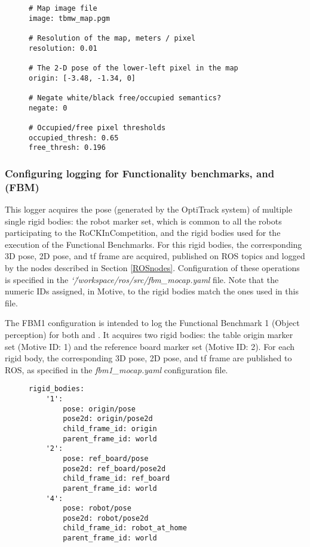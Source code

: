 \documentclass[a4paper]{article}
\newcommand{\ro}{RoCKIn}
\newcommand{\srcdir}{\char`\~/workspace/ros/src/}
\begin{document}
\begin{figure}[h!]
	\noindent
	\begin{minipage}[t!]{\linewidth}
		\begin{lstlisting}[caption=tbmw\_map.yaml]
# Map image file
image: tbmw_map.pgm

# Resolution of the map, meters / pixel
resolution: 0.01

# The 2-D pose of the lower-left pixel in the map
origin: [-3.48, -1.34, 0]

# Negate white/black free/occupied semantics?
negate: 0

# Occupied/free pixel thresholds
occupied_thresh: 0.65
free_thresh: 0.196
		\end{lstlisting}
	\end{minipage}
\end{figure}

\clearpage

\subsubsection{Configuring logging for Functionality benchmarks, \ro@Home and \ro@Work (FBM)}
This logger acquires the pose (generated by the OptiTrack system) of multiple single rigid bodies: the robot marker set, which is common to all the robots participating to the \ro Competition, and the rigid bodies used for the execution of the Functional Benchmarks. For this rigid bodies, the corresponding 3D pose, 2D pose, and tf frame are acquired, published on ROS topics and logged by the nodes described in Section \ref{ROSnodes}.
Configuration of these operations is specified in the \emph{\srcdir fbm\_mocap.yaml} file. Note that the numeric IDs assigned, in Motive, to the rigid bodies match the ones used in this file.

The FBM1 configuration is intended to log the Functional Benchmark 1 (Object perception) for both \ro@Home and \ro@Work.
It acquires two rigid bodies: the table origin marker set (Motive ID: 1) and the reference board marker set (Motive ID: 2).
For each rigid body, the corresponding 3D pose, 2D pose, and tf frame are published to ROS, as specified in the \emph{fbm1\_mocap.yaml} configuration file.

\begin{figure}[h!]
	\noindent
	\begin{minipage}[t!]{\linewidth}
		\begin{lstlisting}[caption=fbm1\_mocap.yaml]
rigid_bodies:
    '1':
        pose: origin/pose
        pose2d: origin/pose2d
        child_frame_id: origin
        parent_frame_id: world
    '2':
        pose: ref_board/pose
        pose2d: ref_board/pose2d
        child_frame_id: ref_board
        parent_frame_id: world
    '4':
	    pose: robot/pose
	    pose2d: robot/pose2d
    	child_frame_id: robot_at_home
	    parent_frame_id: world
		\end{lstlisting}
	\end{minipage}
\end{figure}
\end{document}
